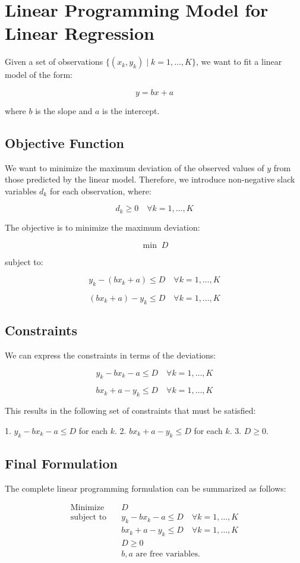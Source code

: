 \documentclass{article}
\begin{document}
\section*{Linear Programming Model for Linear Regression}

Given a set of observations $\{(x_k, y_k) \; | \; k = 1, \ldots, K\}$, we want to fit a linear model of the form:

\[
y = bx + a
\]

where $b$ is the slope and $a$ is the intercept.

\subsection*{Objective Function}
We want to minimize the maximum deviation of the observed values of $y$ from those predicted by the linear model. Therefore, we introduce non-negative slack variables $d_k$ for each observation, where:

\[
d_k \geq 0 \quad \forall k = 1, \ldots, K
\]

The objective is to minimize the maximum deviation:

\[
\min \; D
\]

subject to:

\[
y_k - (bx_k + a) \leq D \quad \forall k = 1, \ldots, K
\]

\[
(bx_k + a) - y_k \leq D \quad \forall k = 1, \ldots, K
\]

\subsection*{Constraints}
We can express the constraints in terms of the deviations:

\[
y_k - bx_k - a \leq D \quad \forall k = 1, \ldots, K
\]

\[
bx_k + a - y_k \leq D \quad \forall k = 1, \ldots, K
\]

This results in the following set of constraints that must be satisfied:

1. $y_k - bx_k - a \leq D$ for each $k$.
2. $bx_k + a - y_k \leq D$ for each $k$.
3. $D \geq 0$.

\subsection*{Final Formulation}
The complete linear programming formulation can be summarized as follows:

\[
\begin{align*}
\text{Minimize} \quad & D \\
\text{subject to} \quad & y_k - bx_k - a \leq D \quad \forall k = 1, \ldots, K \\
& bx_k + a - y_k \leq D \quad \forall k = 1, \ldots, K \\
& D \geq 0 \\
& b, a \text{ are free variables.}
\end{align*}
\]
\end{document}
